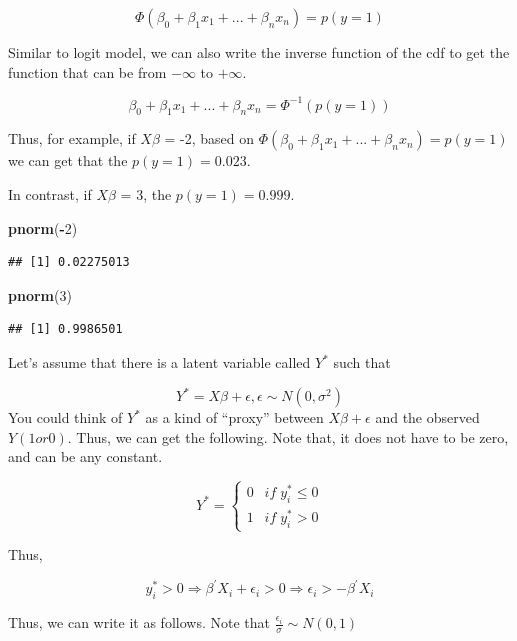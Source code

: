 \documentclass[]{book}
\newenvironment{Shaded}{\begin{snugshade}}{\end{snugshade}}
\newcommand{\KeywordTok}[1]{\textcolor[rgb]{0.13,0.29,0.53}{\textbf{#1}}}
\newcommand{\DecValTok}[1]{\textcolor[rgb]{0.00,0.00,0.81}{#1}}
\newcommand{\OperatorTok}[1]{\textcolor[rgb]{0.81,0.36,0.00}{\textbf{#1}}}
\newcommand{\NormalTok}[1]{#1}
\begin{document}
\[\Phi(\beta_0+\beta_1x_1+...+\beta_nx_n )= p(y=1)\]

Similar to logit model, we can also write the inverse function of the
cdf to get the function that can be from \(-\infty\) to \(+\infty\).

\[\beta_0+\beta_1x_1+...+\beta_nx_n =\Phi^{-1}(p(y=1))\]

Thus, for example, if \(X\beta\) = -2, based on
\(\Phi(\beta_0+\beta_1x_1+...+\beta_nx_n )= p(y=1)\) we can get that the
\(p(y=1)=0.023\).

In contrast, if \(X\beta\) = 3, the \(p(y=1)=0.999\).

\begin{Shaded}
\begin{Highlighting}[]
\KeywordTok{pnorm}\NormalTok{(}\OperatorTok{-}\DecValTok{2}\NormalTok{)}
\end{Highlighting}
\end{Shaded}

\begin{verbatim}
## [1] 0.02275013
\end{verbatim}

\begin{Shaded}
\begin{Highlighting}[]
\KeywordTok{pnorm}\NormalTok{(}\DecValTok{3}\NormalTok{)}
\end{Highlighting}
\end{Shaded}

\begin{verbatim}
## [1] 0.9986501
\end{verbatim}

Let's assume that there is a latent variable called \(Y^*\) such that

\[Y^*=X\beta+\epsilon, \epsilon \sim N(0,\sigma^2)\] You could think of
\(Y^*\) as a kind of ``proxy'' between \(X\beta+\epsilon\) and the
observed \(Y (1 or 0)\). Thus, we can get the following. Note that, it
does not have to be zero, and can be any constant.

\[
Y^*=\begin{cases} 0 \;\;\: if \;  y_i^* \leq 0 \\ 1 \;\;\: if \;  y_i^* > 0 \end{cases}
\]

Thus,

\[y_i^* > 0 \Rightarrow \beta^{'}X_i + \epsilon_i >0 \Rightarrow \epsilon_i > -\beta^{'}X_i\]

Thus, we can write it as follows. Note that
\(\frac{ \epsilon_i}{\sigma} \sim N(0,1)\)
\end{document}
